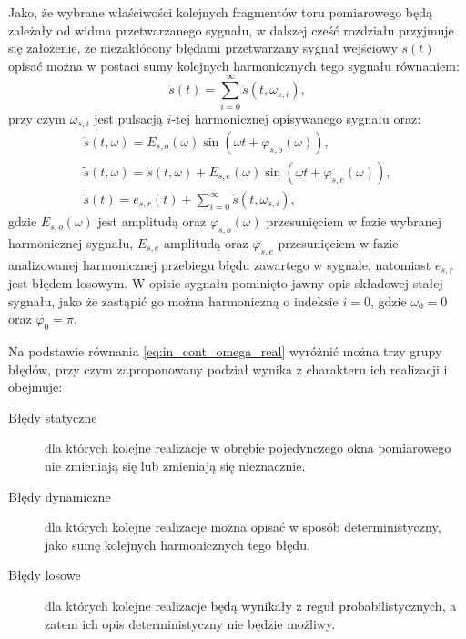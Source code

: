 Jako, że wybrane właściwości kolejnych fragmentów toru pomiarowego będą zależały od widma przetwarzanego sygnału, w dalszej cześć rozdziału przyjmuje się założenie, że niezakłócony błędami przetwarzany sygnał wejściowy $s(t)$ opisać można w postaci sumy kolejnych harmonicznych tego sygnału równaniem:
\begin{equation}
\dot{s} \left( t \right) = \sum _{i = 0} ^{\infty} \dot{s} \left( t, \omega_{s,i} \right) \label{eq:in_cont_sum},
\end{equation}
przy czym $\omega_{s,i}$ jest pulsacją $i$-tej harmonicznej opisywanego sygnału oraz:
\begin{gather}
\dot{s} \left( t, \omega \right) = E_{s,o} \left( \omega \right) \sin \left( \omega t + \varphi_{s,o} \left( \omega \right) \right) \label{eq:in_cont_omega_ideal}, \\
\tilde{s} \left( t, \omega \right) = \dot{s} \left( t, \omega \right) + E_{s,e} \left( \omega \right) \sin \left( \omega t + \varphi_{s,e} \left( \omega \right) \right) \label{eq:in_cont_omega_real}, \\
\tilde{s} \left( t \right) = e_{s,r} \left( t \right) + \sum _{i = 0} ^{\infty} \tilde{s} \left( t, \omega_{s,i} \right) \label{eq:in_cont_sum_real},
\end{gather}
gdzie $E_{s,o}(\omega)$ jest amplitudą oraz $\varphi_{s,o}(\omega)$ przesunięciem w fazie wybranej harmonicznej sygnału, $E_{s,e}$ amplitudą oraz $ \varphi_{s,e}$ przesunięciem w fazie analizowanej harmonicznej przebiegu błędu zawartego w sygnale, natomiast $e_{s,r}$ jest błędem losowym. W opisie sygnału pominięto jawny opis składowej stałej sygnału, jako że zastąpić go można harmoniczną o indeksie $i = 0$, gdzie $\omega_{0} = 0$ oraz $\varphi_{0} = \pi$.

Na podstawie równania \eqref{eq:in_cont_omega_real} wyróżnić można trzy grupy błędów, przy czym zaproponowany podział wynika z charakteru ich realizacji i obejmuje:
\begin{description}
\item [Błędy statyczne] dla których kolejne realizacje w obrębie pojedynczego okna pomiarowego nie zmieniają się lub zmieniają się nieznacznie.
\item [Błędy dynamiczne] dla których kolejne realizacje można opisać w sposób deterministyczny, jako sumę kolejnych harmonicznych tego błędu.
\item [Błędy losowe] dla których kolejne realizacje będą wynikały z reguł probabilistycznych, a zatem ich opis deterministyczny nie będzie możliwy.
\end{description}

